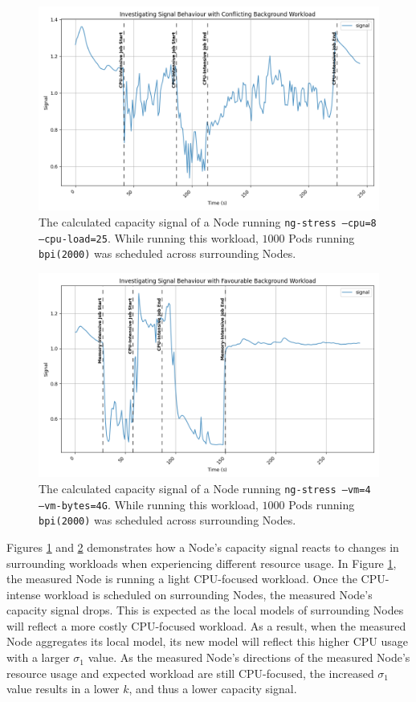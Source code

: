 \begin{figure}[H]
    \centering
    \includegraphics[width=\textwidth]{images/signal-with-cpu.png}
    \caption{The calculated capacity signal of a Node running \texttt{ng-stress
    --cpu=8 --cpu-load=25}. While running this workload, $1000$ Pods running
    \texttt{bpi(2000)} was scheduled across surrounding Nodes.}
    \label{fig:signal-evaluation-cpu}
\end{figure}
\begin{figure}[H]
    \centering
    \includegraphics[width=\textwidth]{images/signal-with-memory.png}
    \caption{The calculated capacity signal of a Node running \texttt{ng-stress
    --vm=4 --vm-bytes=4G}. While running this workload, $1000$ Pods running
    \texttt{bpi(2000)} was scheduled across surrounding Nodes.}
    \label{fig:signal-evaluation-mem}
\end{figure}

Figures \ref{fig:signal-evaluation-cpu} and \ref{fig:signal-evaluation-mem}
demonstrates how a Node's capacity signal reacts to changes in surrounding
workloads when experiencing different resource usage. In Figure
\ref{fig:signal-evaluation-cpu}, the measured Node is running a light CPU-focused
workload. Once the CPU-intense workload is scheduled on surrounding Nodes, the
measured Node's capacity signal drops. This is expected as the local models of
surrounding Nodes will reflect a more costly CPU-focused workload. As a result,
when the measured Node aggregates its local model, its new model will reflect
this higher CPU usage with a larger $\sigma_1$ value. As the measured Node's
directions of the measured Node's resource usage and expected workload are still
CPU-focused, the increased $\sigma_1$ value results in a lower $k$, and thus a
lower capacity signal.

